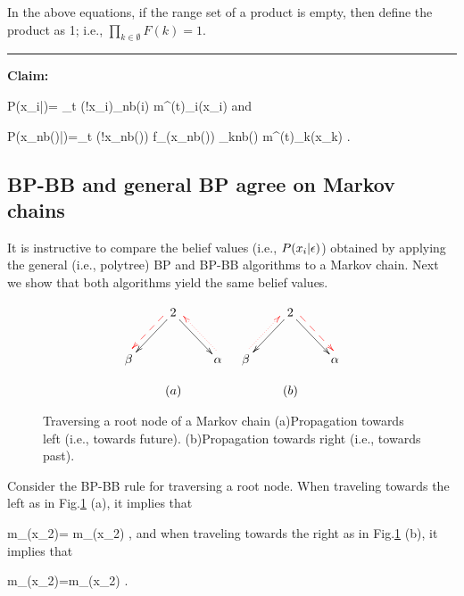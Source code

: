In the above
equations, if the
range set of a product is empty, then
 define the product as 1; i.e.,
$\prod_{k\in \emptyset}F(k)=1$.



\hrule\noindent
{\bf Claim:}

\beq
P(x_i|\eps)=
\lim_{t\rarrow
\infty}\caln(!x_i)\prod_{\alp\in nb(i)}
m^{(t)}_{\alp\rdart i}(x_i)
\;
\label{eq-m-prod}
\eeq
and

\beq
P(x_{nb(\alp)}|\eps)=\lim_{t\rarrow \infty}
\caln(!x_{nb(\alp)})
f_\alp(x_{nb(\alp)})
\prod_{k\in nb(\alp)}
m^{(t)}_{\alp\ldart k}(x_k)
\;.
\label{eq-f-m-prod}
\eeq


\subsection{BP-BB and general BP agree on Markov chains}

It is instructive to 
compare the belief values (i.e., $P(x_i|\epsilon)$)
obtained by
 applying the 
general (i.e., polytree)  BP  
and  BP-BB algorithms  to a Markov chain.
Next we show that both algorithms 
yield the same belief values.

\begin{figure}[h!]
$$
\begin{array}{cc}
\xymatrix{
&2\ar[dr]\ar[dl]\ar@[red]@{-->}@<-1ex>[dl]
\\
\beta
&&\alp\ar@[red]@{.>}@<-1ex>[ul]
}
&
\xymatrix{
&2\ar[dr]\ar[dl]\ar@[red]@{-->}@<1ex>[dr]
\\
\beta\ar@[red]@{.>}@<1ex>[ur]
&&\alp
}
\\
\\
(a)&(b)
\end{array}
$$
\caption{Traversing a root node of a Markov chain
(a)Propagation towards left (i.e., towards future).
(b)Propagation towards right (i.e., towards past).}
\label{fig-mp-markov-trans-root}
\end{figure}

Consider
the BP-BB rule for traversing a root node. 
When traveling
towards the left
as in Fig.\ref{fig-mp-markov-trans-root} (a), 
it implies that

\beq
m_{\alp {}}(x_2)= m_{\beta {}}(x_2)
\;,
\eeq
and
when traveling
towards the right
as in Fig.\ref{fig-mp-markov-trans-root} (b), 
it implies that

\beq
m_{\beta{}}(x_2)=m_{\alp{}}(x_2)
\;.
\eeq



